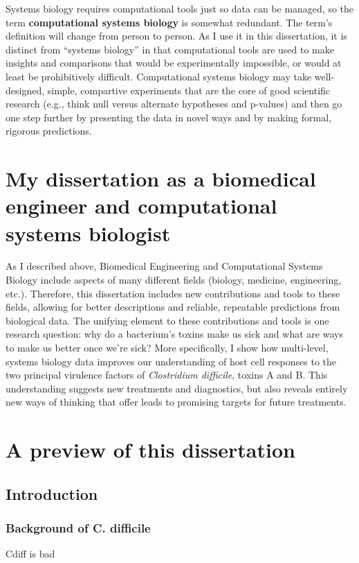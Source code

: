 Systems biology requires computational tools just so data 
can be managed, so the term \textbf{computational systems biology} 
is somewhat redundant. The term’s definition will change 
from person to person. As I use it in this dissertation, 
it is distinct from ``systems biology'' in that computational tools 
are used to make insights and comparisons that would be experimentally 
impossible, or would at least be prohibitively difficult.
Computational systems biology may take well-designed, simple, 
compartive experiments that are the core of good scientific 
research (e.g., think null versus 
alternate hypotheses and p-values) and then go one step further
by presenting the data in novel ways and by making formal, rigorous predictions. 


\section[My dissertation as systems biologist]{My dissertation as a biomedical engineer 
              and computational systems biologist}

As I described above, Biomedical Engineering and Computational Systems
Biology include aspects of many different fields (biology, medicine, engineering, etc.).
Therefore, this dissertation includes new contributions and tools to these fields, 
allowing for better descriptions and reliable, repeatable predictions from biological data.
The unifying element to these contributions and tools is one research question:
why do a bacterium's toxins make us sick and what are ways
to make us better once we're sick? More specifically,
I show how multi-level, systems biology data improves our understanding of host cell responses 
to the two principal virulence factors of \textit{Clostridium difficile}, toxins A and B. 
This understanding suggests new treatments and diagnostics, but also 
reveals entirely new ways of thinking that offer leads to promising targets
for future treatments. 

\section{A preview of this dissertation}

\subsection{Introduction}
\subsubsection{ Background of C. difficile }
Cdiff is bad
